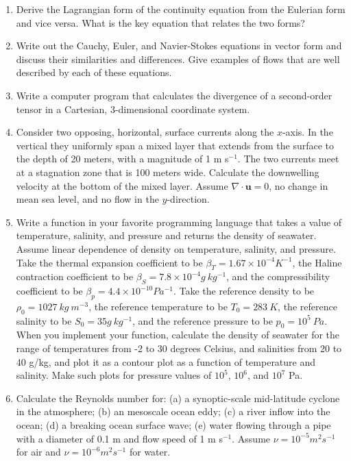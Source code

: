 \documentclass[12pt]{article}
\numberwithin{equation}{section}
\numberwithin{figure}{section}
\numberwithin{table}{section}
\begin{document}
\begin{enumerate}
  \item Derive the Lagrangian form of the continuity equation from
  the Eulerian form and vice versa. What is the key equation that relates the
  two forms?

  \item Write out the Cauchy, Euler, and Navier-Stokes equations in vector form
  and discuss their similarities and differences.
  Give examples of flows that are well described by each of these equations.

  \item Write a computer program that calculates the divergence of a second-order
  tensor in a Cartesian, 3-dimensional coordinate system.

  \item Consider two opposing, horizontal, surface currents along the $x$-axis.
  In the vertical they uniformly span a mixed layer that extends from the
  surface to the depth of 20 meters, with a magnitude of 1 m s$^{-1}$.
  The two currents meet at a stagnation zone that is 100 meters wide.
  Calculate the downwelling velocity at the bottom of the mixed layer.
  Assume $\nabla \cdot \mathbf{u} = 0$, no change in mean sea level, and no
  flow in the $y$-direction.

  \item Write a function in your favorite programming language that takes a
  value of temperature, salinity, and pressure and returns the density of
  seawater. Assume linear dependence of density on temperature, salinity, and
  pressure. Take the thermal expansion coefficient to be $\beta_T = 1.67 \times 10^{-4} K^{-1}$,
  the Haline contraction coefficient to be $\beta_S = 7.8 \times 10^{-4} g\ kg^{-1}$,
  and the compressibility coefficient to be $\beta_p = 4.4 \times 10^{-10} Pa^{-1}$.
  Take the reference density to be $\rho_0 = 1027\ kg\ m^{-3}$, the reference
  temperature to be $T_0 = 283\ K$, the reference salinity to be $S_0 = 35 g\ kg^{-1}$,
  and the reference pressure to be $p_0 = 10^5\ Pa$.
  When you implement your function, calculate the density of seawater for the
  range of temperatures from -2 to 30 degrees Celsius, and salinities from 20 to
  40 g/kg, and plot it as a contour plot as a function of temperature and salinity.
  Make such plots for pressure values of $10^5$, $10^6$, and $10^7$ Pa.

  \item Calculate the Reynolds number for:
  (a) a synoptic-scale mid-latitude cyclone in the atmosphere;
  (b) an mesoscale ocean eddy;
  (c) a river inflow into the ocean;
  (d) a breaking ocean surface wave;
  (e) water flowing through a pipe with a diameter of 0.1 m and flow speed of 1 m s$^{-1}$.
  Assume $\nu = 10^{-5} m^2 s^{-1}$ for air and $\nu = 10^{-6} m^2 s^{-1}$ for water.

\end{enumerate}
\end{document}
